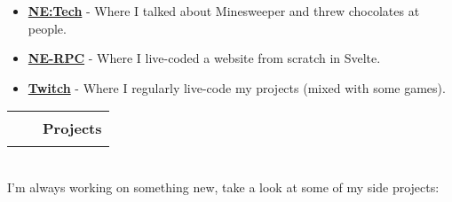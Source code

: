\documentclass[hidelinks, 12pt, a4paper]{article}
\begin{document}
	\begin{itemize}
		\item \begin{small}\href{https://www.youtube.com/watch?v=2ibiA5TEsxw}{\textbf{NE:Tech}} - Where I talked about Minesweeper and threw chocolates at people.\end{small}
		
		\item \begin{small}\href{https://www.youtube.com/watch?v=P6u0Uv_VxCU}{\textbf{NE-RPC}} - Where I live-coded a website from scratch in Svelte.\end{small}
		
		\item \begin{small}\href{https://www.twitch.tv/stewaterman}{\textbf{Twitch}} - Where I regularly live-code my projects (mixed with some games).\end{small}
	\end{itemize}


	
	\begin{tabularx}{\textwidth}{@{}Xrr@{}}&
		\rule{50pt}{1pt}&
		\textbf{Projects}
	\end{tabularx}\\

	I'm always working on something new, take a look at some of my side projects:
	
\end{document}

